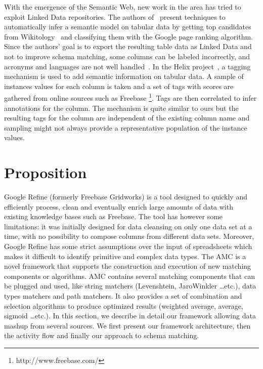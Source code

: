 \documentclass{sig-alternate}
\begin{document}
With the emergence of the Semantic Web, new work in the area has tried to exploit Linked Data repositories. The authors of~\cite{Syed2010Tables} present techniques to automatically infer a semantic model on tabular data by getting top candidates from Wikitology~\cite{conf/aaaiss/FininSMMP09} and classifying them with the Google page ranking algorithm. Since the authors' goal is to export the resulting table data as Linked Data and not to improve schema matching, some columns can be labeled incorrectly, and acronyms and languages are not well handled~\cite{Syed2010Tables}. In the Helix project~\cite{conf/www/HassanzadehDFKSW11}, a tagging mechanism is used to add semantic information on tabular data. A sample of instances values for each column is taken and a set of tags with scores are gathered from online sources such as Freebase \footnote{http://www.freebase.com/}. Tags are then correlated to infer annotations for the column. The mechanism is quite similar to ours but the resulting tags for the column are independent of the existing column name and sampling might not always provide a representative population of the instance values.


\section{Proposition}

Google Refine (formerly Freebase Gridworks) is a tool designed to quickly and efficiently process, clean and eventually enrich large amounts of data with existing knowledge bases such as Freebase. The tool has however some limitations: it was initially designed for data cleansing on only one data set at a time, with no possibility to compose columns from different data sets. Moreover, Google Refine has some strict assumptions over the input of spreadsheets which makes it difficult to identify primitive and complex data types.
The AMC is a novel framework that supports the construction and execution of new matching components or algorithms. AMC contains several matching components that can be plugged and used, like string matchers (Levenshtein, JaroWinkler \dots  etc.), data types matchers and path matchers. It also provides a set of combination and selection algorithms to produce optimized results (weighted average, average, sigmoid \dots  etc.).
In this section, we describe in detail our framework allowing data mashup from several sources. We first present our framework architecture, then the activity flow and finally our approach to schema matching.
\end{document}
